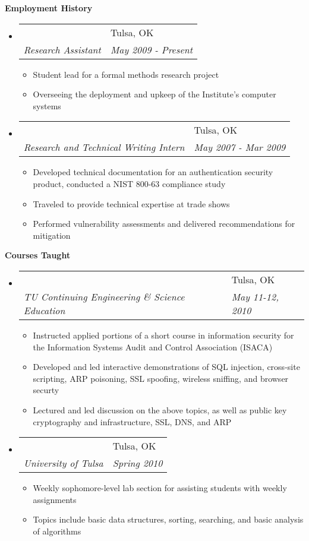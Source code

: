 \documentclass[letterpaper,11pt]{article}
\makeatletter
\newcommand{\resitem}[1]{\item \parbox[t]{4.6in}{#1} \vspace{-2pt}}
\newcommand{\resheading}[1]{{\large \colorbox{mygrey}{\begin{minipage}{\textwidth}{\textbf{#1 \vphantom{p\^{E}}}}\end{minipage}}}}
\newcommand{\ressubheading}[4]{
\begin{tabular*}{6.5in}[t]{l@{\extracolsep{\fill}}l}
		\textbf{\parbox[t]{4.5in}{\raggedright #1 }} & \parbox[b]{1.5in}{#2} \\
		\textit{#3} & \textit{#4} \\
\end{tabular*}\vspace{-6pt}}
\makeatother
\begin{document}

\resheading{Employment History}
\begin{itemize}
\item
	\ressubheading{Institute for Information Security at the University of Tulsa}{Tulsa, OK}{Research Assistant}{May 2009 - Present}
	\begin{itemize}
		\resitem{Student lead for a formal methods research project}
		\resitem{Overseeing the deployment and upkeep of the Institute's computer systems}
	\end{itemize}

\item
	\ressubheading{Vidoop}{Tulsa, OK}{Research and Technical Writing Intern}{May 2007 - Mar 2009}
	\begin{itemize}
		\resitem{Developed technical documentation for an authentication security product, conducted a NIST 800-63 compliance study}
		\resitem{Traveled to provide technical expertise at trade shows}
		\resitem{Performed vulnerability assessments and delivered recommendations for mitigation}
	\end{itemize}
\end{itemize}

\resheading{Courses Taught}
\begin{itemize}

\item
	\ressubheading{Information Security -- Assurance and Risk Assessment}{Tulsa, OK}{TU Continuing Engineering \& Science Education}{May 11-12, 2010}
	\begin{itemize}
		\resitem{Instructed applied portions of a short course in information security for the Information Systems Audit and Control Association (ISACA)}
		\resitem{Developed and led interactive demonstrations of SQL injection, cross-site scripting, ARP poisoning, SSL spoofing, wireless sniffing, and browser securty}
		\resitem{Lectured and led discussion on the above topics, as well as public key cryptography and infrastructure, SSL, DNS, and ARP}
	\end{itemize}

\item
	\ressubheading{Fundamentals of Algorithms and Computer Applications Lab}{Tulsa, OK}{University of Tulsa}{Spring 2010}
	\begin{itemize}
		\resitem{Weekly sophomore-level lab section for assisting students with weekly assignments}
		\resitem{Topics include basic data structures, sorting, searching, and basic analysis of algorithms}
	\end{itemize}
\end{itemize}
\end{document}
